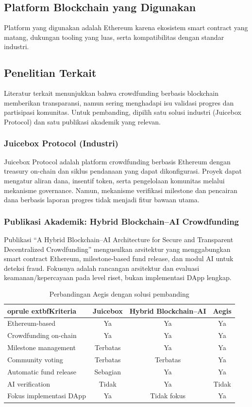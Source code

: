 \documentclass[12pt]{article}
\begin{document}
\subsection{Platform Blockchain yang Digunakan}
Platform yang digunakan adalah Ethereum karena ekosistem smart contract yang matang, dukungan tooling yang luas, serta kompatibilitas dengan standar industri.

\subsection{Penelitian Terkait}
Literatur terkait menunjukkan bahwa crowdfunding berbasis blockchain memberikan transparansi, namun sering menghadapi isu validasi progres dan partisipasi komunitas. Untuk pembanding, dipilih satu solusi industri (Juicebox Protocol) dan satu publikasi akademik yang relevan.

\subsubsection{Juicebox Protocol (Industri)}
Juicebox Protocol adalah platform crowdfunding berbasis Ethereum dengan treasury on-chain dan siklus pendanaan yang dapat dikonfigurasi. Proyek dapat mengatur aliran dana, insentif token, serta pengelolaan komunitas melalui mekanisme governance. Namun, mekanisme verifikasi milestone dan pencairan dana berbasis laporan progres tidak menjadi fitur bawaan utama.\cite{juicebox}

\subsubsection{Publikasi Akademik: Hybrid Blockchain--AI Crowdfunding}
Publikasi ``A Hybrid Blockchain--AI Architecture for Secure and Transparent Decentralized Crowdfunding'' mengusulkan arsitektur yang menggabungkan smart contract Ethereum, milestone-based fund release, dan modul AI untuk deteksi fraud. Fokusnya adalah rancangan arsitektur dan evaluasi keamanan/kepercayaan pada level riset, bukan implementasi DApp lengkap.\cite{hybridai}

\begin{table}[h]
\centering
\caption{Perbandingan Aegis dengan solusi pembanding}
\label{tab:comparison}
\begin{tabular}{lccc}
	oprule
	extbf{Kriteria} & \textbf{Juicebox} & \textbf{Hybrid Blockchain--AI} & \textbf{Aegis} \\
\midrule
Ethereum-based & Ya & Ya & Ya \\
Crowdfunding on-chain & Ya & Ya & Ya \\
Milestone management & Terbatas & Ya & Ya \\
Community voting & Terbatas & Terbatas & Ya \\
Automatic fund release & Sebagian & Ya & Ya \\
AI verification & Tidak & Ya & Tidak \\
Fokus implementasi DApp & Ya & Tidak fokus & Ya \\
\bottomrule
\end{tabular}
\end{table}
\end{document}
